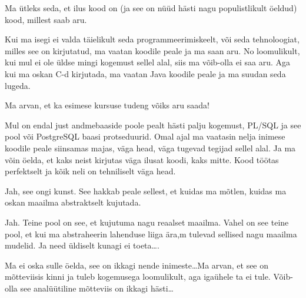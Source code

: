 
Ma ütleks seda, et ilus kood on (ja see on nüüd hästi nagu populistlikult 
öeldud) kood, millest saab aru. 

Kui ma isegi ei valda täielikult seda programmeerimiskeelt, või seda 
tehnoloogiat, milles see on kirjutatud, ma vaatan koodile peale ja ma saan aru. 
No loomulikult, kui mul ei ole üldse mingi kogemust sellel alal, siis ma 
võib-olla ei saa aru. Aga kui ma oskan C-d  kirjutada, ma vaatan Java koodile 
peale ja ma suudan seda lugeda. 


Ma arvan, et ka esimese kursuse tudeng võiks aru saada!

Mul on endal just andmebaaside poole pealt hästi palju kogemust, PL/SQL ja see 
pool või PostgreSQL baasi protseduurid. Omal ajal ma vaatasin nelja inimese 
koodile peale siinsamas majas, väga head, väga tugevad tegijad sellel 
alal. Ja ma võin öelda, et kaks neist kirjutas väga ilusat koodi, kaks mitte. 
Kood töötas perfektselt ja kõik neli on tehniliselt väga head. 


Jah, see ongi kunst. See hakkab peale sellest, et kuidas ma mõtlen, kuidas ma  
oskan maailma abstraktselt kujutada. 


Jah. Teine pool on see, et kujutuma nagu reaalset maailma. Vahel on see teine 
pool, et kui ma abstraheerin lahenduse liiga ära,m tulevad sellised nagu 
maailma mudelid. Ja need üldiselt kunagi ei toeta\ldots. 


Ma ei oska sulle öelda, see on ikkagi nende inimeste\ldots Ma arvan, et see on 
mõtteviisis kinni ja tuleb kogemusega loomulikult, aga igaühele ta ei tule. 
Võib-olla see analüütiline mõtteviis on ikkagi hästi\ldots 

